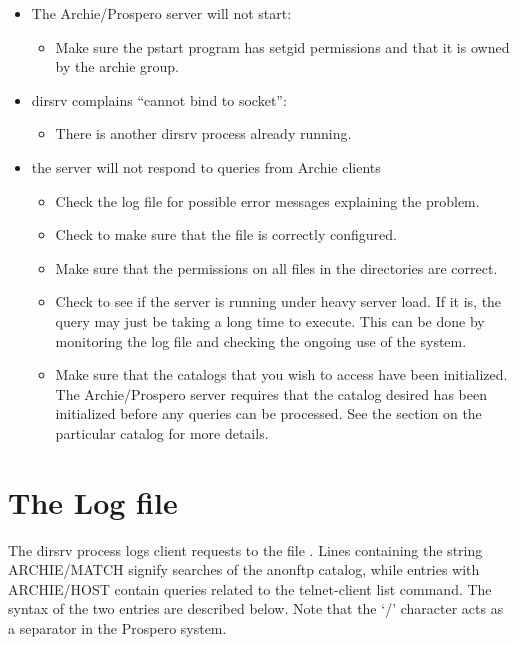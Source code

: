 \begin{itemize}

\item The Archie/Prospero server will not start: \NOTE

\begin{itemize}
\item 
Make sure the pstart program has setgid permissions and that it is owned by
the archie group.
\end{itemize}

\item dirsrv complains ``cannot bind to socket'':

\begin{itemize}
\item 
There is another dirsrv process already running.
\end{itemize}

\item
the server will not respond to queries from Archie clients

\begin{itemize}
\item 
Check the log file for possible error messages explaining the problem.

\item
Check to make sure that the  file is correctly
configured.

\item
Make sure that the permissions on all files in the  directories
are correct.

\item
Check to see if the server is running under heavy server load. If it is, the
query may just be taking a long time to execute. This can be done by
monitoring the log file and checking the ongoing use of the system.

\item
 Make sure that the catalogs that you wish to access have been
initialized. The Archie/Prospero server requires that the catalog desired has
been initialized before any queries can be processed. See the section on the
particular catalog for more details.
\end{itemize}
\end{itemize}


\section{The Log file}

The dirsrv process logs client requests to the file . Lines
containing the string ARCHIE/MATCH signify searches of the anonftp catalog,
while entries with ARCHIE/HOST contain queries related to the telnet-client
list command. The syntax of the two entries are described below. Note that the
`/' character acts as a separator in the Prospero system.




